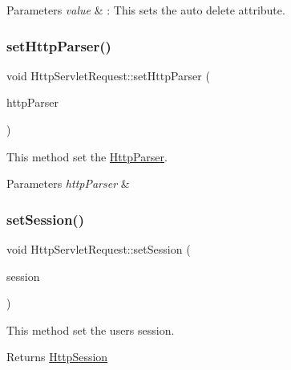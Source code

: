 \begin{DoxyParams}{Parameters}
{\em value} & \+: This sets the auto delete attribute. \\
\hline
\end{DoxyParams}
\mbox{\label{class_http_servlet_request_ab7bf2b4dc9f9335ce747e9dc2221e018}} 
\subsubsection{\texorpdfstring{set\+Http\+Parser()}{setHttpParser()}}
{\footnotesize\ttfamily void Http\+Servlet\+Request\+::set\+Http\+Parser (\begin{DoxyParamCaption}\item[{\hyperlink{class_http_parser}{Http\+Parser} \&}]{http\+Parser }\end{DoxyParamCaption})}



This method set the \hyperlink{class_http_parser}{Http\+Parser}. 


\begin{DoxyParams}{Parameters}
{\em http\+Parser} & \\
\hline
\end{DoxyParams}
\mbox{\label{class_http_servlet_request_a52143e9c7db683d28ca9763d4357308a}} 
\subsubsection{\texorpdfstring{set\+Session()}{setSession()}}
{\footnotesize\ttfamily void Http\+Servlet\+Request\+::set\+Session (\begin{DoxyParamCaption}\item[{\hyperlink{class_http_session}{Http\+Session} \&}]{session }\end{DoxyParamCaption})}



This method set the user\textquotesingle{}s session. 

\begin{DoxyReturn}{Returns}
\hyperlink{class_http_session}{Http\+Session} 
\end{DoxyReturn}



